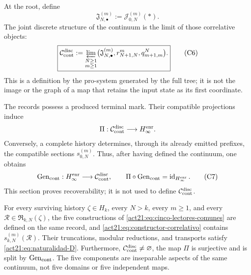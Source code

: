 At the root, define
\[
 \mathfrak J_{N,\bullet}^{(m)}:=\mathcal J_{0,N}^{(m)}(\ast).
\tag{C5}
\label{act21:eq:fibras-conjuntas-horizonte}
\]
The joint discrete structure of the continuum is the limit of those
correlative objects:
\[
 \boxed{
 \mathcal C_{\rm cont}^{\rm disc}
 :=\varprojlim_{\substack{N\geq1\\m\geq1}}
   \bigl(\mathfrak J_{N,\bullet}^{(m)},
         r^m_{N+1,N},q^N_{m+1,m}\bigr).}
\tag{C6}
\label{act21:eq:continuo-discreto}
\]
This is a definition by the pro-system generated by the full tree; it is not
the image or the graph of a map that retains the input state as its
first coordinate.

The records possess a produced terminal mark. Their compatible projections
induce
\[
 \Pi:\mathcal C_{\rm cont}^{\rm disc}\longrightarrow H_\infty^{\rm enr}.
\]
Conversely, a complete history determines, through its already emitted prefixes,
the compatible sections \(s_{0,N}^{(m)}\). Thus, after having
defined the continuum, one obtains
\[
 \operatorname{Gen}_{\rm cont}:H_\infty^{\rm enr}
 \longrightarrow\mathcal C_{\rm cont}^{\rm disc},
 \qquad
 \Pi\circ\operatorname{Gen}_{\rm cont}
 =\operatorname{id}_{H_\infty^{\rm enr}}.
\tag{C7}
\label{act21:eq:seccion-historias-continuo}
\]
This section proves recoverability; it is not used to define
\(\mathcal C_{\rm cont}^{\rm disc}\).

\begin{theorem}
\label{act21:thm:correlacion-cinco}
For every surviving history \(\zeta\in H_k\), every \(N>k\), every
\(m\geq1\), and every \(\mathscr R\in\mathfrak R_{k,N}(\zeta)\), the five
constructions of \eqref{act21:eq:cinco-lectores-comunes} are defined on the
same record, and \eqref{act21:eq:constructor-correlativo} contains
\(s_{k,N}^{(m)}(\mathscr R)\). Their truncations, modular reductions, and
transports satisfy \eqref{act21:eq:naturalidad-D}. Furthermore,
\(\mathcal C_{\rm cont}^{\rm disc}\neq\varnothing\), the map \(\Pi\)
is surjective and is split by \(\operatorname{Gen}_{\rm cont}\). The
five components are inseparable aspects of the same continuum, not five
domains or five independent maps.
\end{theorem}

